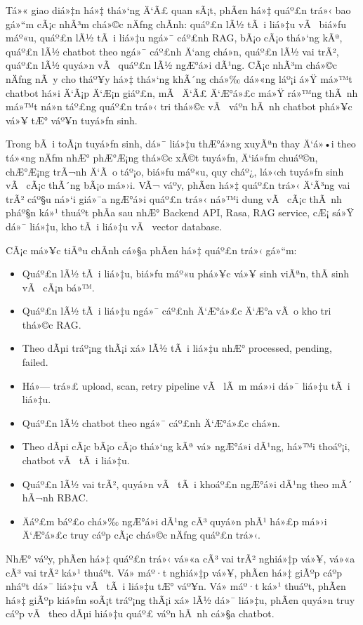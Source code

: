 ﻿\documentclass[12pt,a4paper]{report}
\begin{document}
Tá»« giao diá»‡n há»‡ thá»‘ng Ä‘Ã£ quan sÃ¡t, phÃ¢n há»‡ quáº£n trá»‹ bao gá»“m cÃ¡c nhÃ³m chá»©c nÄƒng chÃ­nh: quáº£n lÃ½ tÃ i liá»‡u vÃ  biá»ƒu máº«u, quáº£n lÃ½ tÃ i liá»‡u ngá»¯ cáº£nh RAG, bÃ¡o cÃ¡o thá»‘ng kÃª, quáº£n lÃ½ chatbot theo ngá»¯ cáº£nh Ä‘ang chá»n, quáº£n lÃ½ vai trÃ², quáº£n lÃ½ quyá»n vÃ  quáº£n lÃ½ ngÆ°á»i dÃ¹ng. CÃ¡c nhÃ³m chá»©c nÄƒng nÃ y cho tháº¥y há»‡ thá»‘ng khÃ´ng chá»‰ dá»«ng láº¡i á»Ÿ má»™t chatbot há»i Ä‘Ã¡p Ä‘Æ¡n giáº£n, mÃ  Ä‘Ã£ Ä‘Æ°á»£c má»Ÿ rá»™ng thÃ nh má»™t ná»n táº£ng quáº£n trá»‹ tri thá»©c vÃ  váº­n hÃ nh chatbot phá»¥c vá»¥ tÆ° váº¥n tuyá»ƒn sinh.

Trong bÃ i toÃ¡n tuyá»ƒn sinh, dá»¯ liá»‡u thÆ°á»ng xuyÃªn thay Ä‘á»•i theo tá»«ng nÄƒm nhÆ° phÆ°Æ¡ng thá»©c xÃ©t tuyá»ƒn, Ä‘iá»ƒm chuáº©n, chÆ°Æ¡ng trÃ¬nh Ä‘Ã o táº¡o, biá»ƒu máº«u, quy cháº¿, lá»‹ch tuyá»ƒn sinh vÃ  cÃ¡c thÃ´ng bÃ¡o má»›i. VÃ¬ váº­y, phÃ¢n há»‡ quáº£n trá»‹ Ä‘Ã³ng vai trÃ² cáº§u ná»‘i giá»¯a ngÆ°á»i quáº£n trá»‹ ná»™i dung vÃ  cÃ¡c thÃ nh pháº§n ká»¹ thuáº­t phÃ­a sau nhÆ° Backend API, Rasa, RAG service, cÆ¡ sá»Ÿ dá»¯ liá»‡u, kho tÃ i liá»‡u vÃ  vector database.

CÃ¡c má»¥c tiÃªu chÃ­nh cá»§a phÃ¢n há»‡ quáº£n trá»‹ gá»“m:

\begin{itemize}
    \item Quáº£n lÃ½ tÃ i liá»‡u, biá»ƒu máº«u phá»¥c vá»¥ sinh viÃªn, thÃ­ sinh vÃ  cÃ¡n bá»™.
    \item Quáº£n lÃ½ tÃ i liá»‡u ngá»¯ cáº£nh Ä‘Æ°á»£c Ä‘Æ°a vÃ o kho tri thá»©c RAG.
    \item Theo dÃµi tráº¡ng thÃ¡i xá»­ lÃ½ tÃ i liá»‡u nhÆ° processed, pending, failed.
    \item Há»— trá»£ upload, scan, retry pipeline vÃ  lÃ m má»›i dá»¯ liá»‡u tÃ i liá»‡u.
    \item Quáº£n lÃ½ chatbot theo ngá»¯ cáº£nh Ä‘Æ°á»£c chá»n.
    \item Theo dÃµi cÃ¡c bÃ¡o cÃ¡o thá»‘ng kÃª vá» ngÆ°á»i dÃ¹ng, há»™i thoáº¡i, chatbot vÃ  tÃ i liá»‡u.
    \item Quáº£n lÃ½ vai trÃ², quyá»n vÃ  tÃ i khoáº£n ngÆ°á»i dÃ¹ng theo mÃ´ hÃ¬nh RBAC.
    \item Äáº£m báº£o chá»‰ ngÆ°á»i dÃ¹ng cÃ³ quyá»n phÃ¹ há»£p má»›i Ä‘Æ°á»£c truy cáº­p cÃ¡c chá»©c nÄƒng quáº£n trá»‹.
\end{itemize}

NhÆ° váº­y, phÃ¢n há»‡ quáº£n trá»‹ vá»«a cÃ³ vai trÃ² nghiá»‡p vá»¥, vá»«a cÃ³ vai trÃ² ká»¹ thuáº­t. Vá» máº·t nghiá»‡p vá»¥, phÃ¢n há»‡ giÃºp cáº­p nháº­t dá»¯ liá»‡u vÃ  tÃ i liá»‡u tÆ° váº¥n. Vá» máº·t ká»¹ thuáº­t, phÃ¢n há»‡ giÃºp kiá»ƒm soÃ¡t tráº¡ng thÃ¡i xá»­ lÃ½ dá»¯ liá»‡u, phÃ¢n quyá»n truy cáº­p vÃ  theo dÃµi hiá»‡u quáº£ váº­n hÃ nh cá»§a chatbot.
\end{document}
